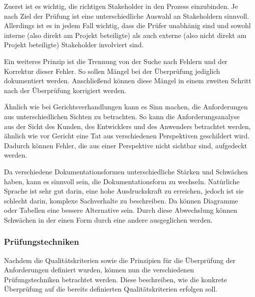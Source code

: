 Zuerst ist es wichtig, die richtigen Stakeholder in den Prozess einzubinden.
Je nach Ziel der Prüfung ist eine unterschiedliche Auswahl an Stakeholdern sinnvoll.
Allerdings ist es in jedem Fall wichtig, dass die Prüfer unabhänig sind und sowohl interne (also direkt am Projekt beteiligte) als auch externe (also nicht direkt am Projekt beteiligte) Stakeholder involviert sind\autocite[vgl.][Seite 26]{Maulhardt.c}.

Ein weiteres Prinzip ist die Trennung von der Suche nach Fehlern und der Korrektur dieser Fehler.
So sollen Mängel bei der Überprüfung jediglich dokumentiert werden.
Anschließend können diese Mängel in einem zweiten Schritt nach der Überprüfung korrigiert werden\autocite[vgl.][Seite 26]{Maulhardt.c}.

Ähnlich wie bei Gerichtsverhandlungen kann es Sinn machen, die Anforderungen aus unterschiedlichen Sichten zu betrachten.
So kann die Anforderungsanalyse aus der Sicht des Kunden, des Entwicklers und des Anwenders betrachtet werden, ähnlich wie vor Gericht eine Tat aus verschiedenen Perspektiven geschildert wird.
Dadurch können Fehler, die aus einer Perspektive nicht sichtbar sind, aufgedeckt werden\autocite[vgl.][Seite 27]{Maulhardt.c}.

Da verschiedene Dokumentationsformen unterschiedliche Stärken und Schwächen haben, kann es sinnvoll sein, die Dokumentationsform zu wechseln.
Natürliche Sprache ist sehr gut darin, eine hohe Ausdruckskraft zu erreichen, jedoch ist sie schlecht darin, komplexe Sachverhalte zu beschreiben.
Da können Diagramme oder Tabellen eine bessere Alternative sein.
Durch diese Abwechslung können Schwächen in der einen Form durch eine andere ausgeglichen werden\autocite[vgl.][Seite 28]{Maulhardt.c}.

\subsubsection{Prüfungstechniken}
Nachdem die Qualitätskriterien sowie die Prinzipien für die Überprüfung der Anforderungen definiert wurden, können nun die verschiedenen Prüfungstechniken betrachtet werden.
Diese beschreiben, wie die konkrete Überprüfung auf die bereits definierten Qualitätskriterien erfolgen soll.

